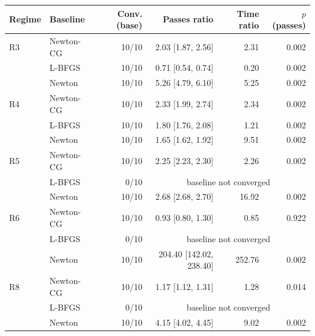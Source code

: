 \begin{tabular}{llrrrr}
\toprule
Regime & Baseline & Conv. (base) & Passes ratio & Time ratio & $p$ (passes) \\
\midrule
R3 & Newton-CG & 10/10 & 2.03 [1.87, 2.56] & 2.31 & 0.002 \\
 & L-BFGS & 10/10 & 0.71 [0.54, 0.74] & 0.20 & 0.002 \\
 & Newton & 10/10 & 5.26 [4.79, 6.10] & 5.25 & 0.002 \\
\midrule
R4 & Newton-CG & 10/10 & 2.33 [1.99, 2.74] & 2.34 & 0.002 \\
 & L-BFGS & 10/10 & 1.80 [1.76, 2.08] & 1.21 & 0.002 \\
 & Newton & 10/10 & 1.65 [1.62, 1.92] & 9.51 & 0.002 \\
\midrule
R5 & Newton-CG & 10/10 & 2.25 [2.23, 2.30] & 2.26 & 0.002 \\
 & L-BFGS & 0/10 & \multicolumn{3}{c}{baseline not converged} \\
 & Newton & 10/10 & 2.68 [2.68, 2.70] & 16.92 & 0.002 \\
\midrule
R6 & Newton-CG & 10/10 & 0.93 [0.80, 1.30] & 0.85 & 0.922 \\
 & L-BFGS & 0/10 & \multicolumn{3}{c}{baseline not converged} \\
 & Newton & 10/10 & 204.40 [142.02, 238.40] & 252.76 & 0.002 \\
\midrule
R8 & Newton-CG & 10/10 & 1.17 [1.12, 1.31] & 1.28 & 0.014 \\
 & L-BFGS & 0/10 & \multicolumn{3}{c}{baseline not converged} \\
 & Newton & 10/10 & 4.15 [4.02, 4.45] & 9.02 & 0.002 \\
\bottomrule
\end{tabular}